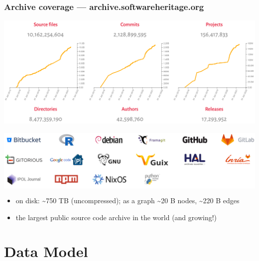 \documentclass[aspectratio=169,xcolor=table]{beamer}
\begin{document}
    \begin{frame}
        \frametitle{Archive coverage --- archive.softwareheritage.org}
        \begin{center}
            \includegraphics[trim=0 2cm 0 0, clip, width=0.7\linewidth]{img/archive-growth.png}
        \end{center}
        \begin{center}
            \colorbox{white}{\includegraphics[width=0.8\linewidth]{img/archive-coverage.png}}
        \end{center}
        \vspace{-2mm}
        \begin{block}{}
            \begin{itemize}
                \item on disk: \textasciitilde{}750 TB (uncompressed); as a
                    graph \textasciitilde{}20 B nodes, \textasciitilde{}220 B
                    edges
                \item the largest public source code archive in the world (and
                    growing!)
            \end{itemize}
        \end{block}
    \end{frame}



    \section{Data Model}
\end{document}
